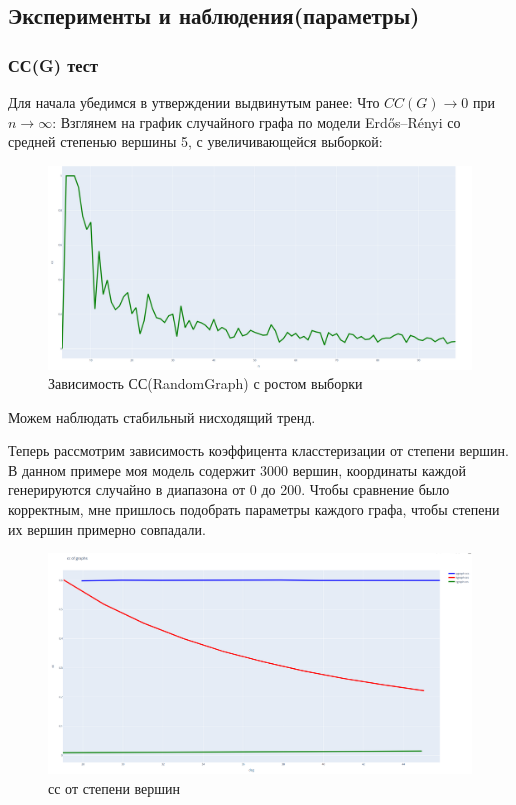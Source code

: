 \subsection{Эксперименты и наблюдения(параметры)}

\subsubsection{СС(G) тест}

Для начала убедимся в утверждении выдвинутым ранее: Что $CC(G) \rightarrow 0$ при $n \rightarrow \infty$:
Взглянем на график случайного графа по модели Erdős–Rényi со средней степенью вершины 5,
с увеличивающейся выборкой:

\begin{figure}[H]
    \centering
    \includegraphics[scale=0.25]{./pictures/random_cc_long_period.png}
    \caption{Зависимость СС(RandomGraph) с ростом выборки} \label{сс от степени вершин}
\end{figure}
Можем наблюдать стабильный нисходящий тренд.

Теперь рассмотрим зависимость коэффицента класстеризации от степени вершин.
В данном примере моя модель содержит 3000 вершин, координаты каждой генерируются случайно 
в диапазона от 0 до 200. Чтобы сравнение было корректным, мне пришлось подобрать параметры
каждого графа, чтобы степени их вершин примерно совпадали.

\begin{figure}[H]
    \centering
    \includegraphics[scale=0.25]{./pictures/cc_better.png}
    \caption{сс от степени вершин} \label{сс}
\end{figure}

